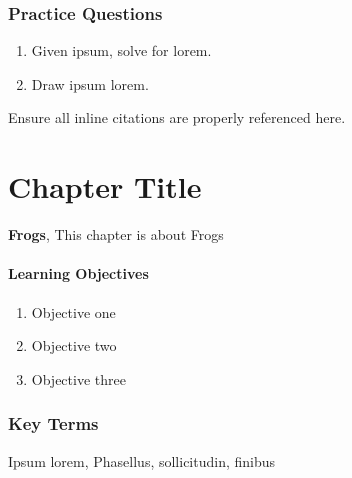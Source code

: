 \documentclass[
]{book}
\providecommand{\tightlist}{%
  \setlength{\itemsep}{0pt}\setlength{\parskip}{0pt}}
\begin{document}
\hypertarget{practice-questions-1}{%
\subsection*{Practice Questions}\label{practice-questions-1}}

\begin{enumerate}
\def\labelenumi{\arabic{enumi}.}
\setcounter{enumi}{1}
\tightlist
\item
  Given ipsum, solve for lorem.
\item
  Draw ipsum lorem.
\end{enumerate}

Ensure all inline citations are properly referenced here.

\hypertarget{data-integration}{%
\chapter{Chapter Title}\label{data-integration}}

\textbf{Frogs}, This chapter is about Frogs

\hypertarget{learning-objectives-3}{%
\subsubsection*{Learning Objectives}\label{learning-objectives-3}}

\begin{enumerate}
\def\labelenumi{\arabic{enumi}.}
\tightlist
\item
  Objective one
\item
  Objective two
\item
  Objective three
\end{enumerate}

\hypertarget{key-terms-3}{%
\subsection*{Key Terms}\label{key-terms-3}}

Ipsum lorem, Phasellus, sollicitudin, finibus
\end{document}

